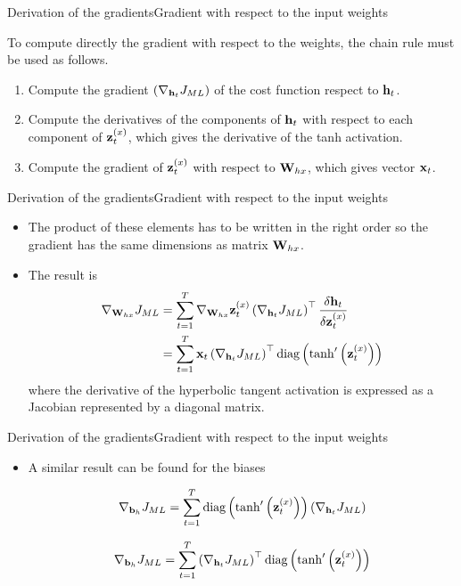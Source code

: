 \documentclass{beamer}
\begin{document}
\begin{frame}{Derivation of the gradients}{Gradient with respect to the input weights}

To compute directly the gradient with respect to the weights, the chain rule must be used as follows. 
\begin{enumerate}
\item Compute the gradient  $\left(\nabla_{{\bf h}_t} J_{ML}\right)$ of the cost function  respect to ${\bf h}_t$. 
\item Compute the derivatives of the components of ${\bf h}_t$ with respect to each component of ${\bf z}_t^{(x)}$, which gives the derivative of the tanh activation. 
\item Compute the gradient of ${\bf z}_t^{(x)}$ with respect to ${\bf W}_{hx}$, which gives vector ${\bf x}_t$. 
\end{enumerate}

\end{frame}

\begin{frame}{Derivation of the gradients}{Gradient with respect to the input weights}
    \begin{itemize}
        \item The product of these elements has to be written in the right order so the gradient has the same dimensions as matrix ${\bf W}_{hx}$.
        \item The result is  
\begin{equation}\label{eq:gradient_hx}
\begin{split}
    \nabla_{{\bf W}_{hx}} J_{ML} &=\sum_{t=1}^T \nabla_{{\bf W}_{hx}}{\bf z}^{(x)}_t  \left(\nabla_{{\bf h}_t} J_{ML}\right)^\top \frac{\delta {\bf h}_t}{\delta {\bf z}^{(x)}_t}\\
    &=\sum_{t=1}^T {\bf x}_t   \left(\nabla_{{\bf h}_t} J_{ML}\right)^\top\text{diag}\left( \tanh'\left({\bf z}^{(x)}_t\right) \right)
\end{split}
\end{equation}
where  the derivative of the hyperbolic tangent activation is  expressed as a Jacobian represented by a diagonal matrix. 
    \end{itemize}
\end{frame}
\begin{frame}{Derivation of the gradients}{Gradient with respect to the input weights}
\begin{itemize}
    \item A similar result can be found  for the biases 


\begin{equation}\label{eq:gradient_bias_h}
    \nabla_{{\bf b}_{h}} J_{ML} =\sum_{t=1}^T    \text{diag}\left( \tanh'\left({\bf z}^{(x)}_t\right) \right)\left(\nabla_{{\bf h}_t} J_{ML}\right)
\end{equation}

    
\begin{equation}
    \nabla_{{\bf b}_{h}} J_{ML} =\sum_{t=1}^T    \left(\nabla_{{\bf h}_t} J_{ML}\right)^\top\text{diag}\left( \tanh'\left({\bf z}^{(x)}_t\right) \right)
\end{equation}
\end{itemize}
\end{frame}
\end{document}
